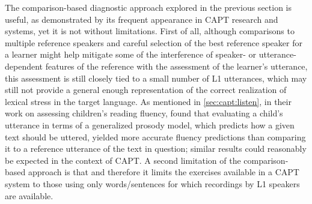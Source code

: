 	
	
	
	The comparison-based diagnostic approach explored in the previous section is useful, as demonstrated by its frequent appearance in CAPT research and systems, yet it is not without limitations. First of all, although comparisons to multiple reference speakers and careful selection of the best reference speaker for a learner might help mitigate some of the interference of speaker- or utterance-dependent features of the reference with the assessment of the learner's utterance, this assessment is still closely tied to a small number of L1 utterances, which may still not provide a general enough representation of the correct realization of lexical stress in the target language. 
	 As mentioned in \cref{sec:capt:listen}, in their work on assessing children's reading fluency, \textcite{Duong2011} found that evaluating a child's utterance in terms of a generalized prosody model, which predicts how a given text should be uttered, yielded more accurate fluency predictions than comparing it to a reference utterance of the text in question; similar results could reasonably be expected in the context of CAPT.
	A second limitation of the comparison-based approach is that 
	and therefore 
	it limits the exercises available in a CAPT system to those using only words/sentences for which recordings by L1 speakers are available.
	
